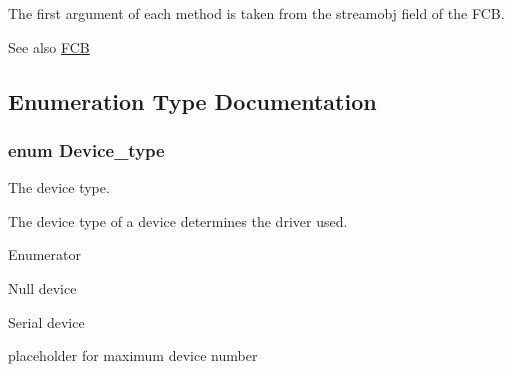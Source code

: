 The first argument of each method is taken from the \textquotesingle{}streamobj\textquotesingle{} field of the F\+CB. \begin{DoxySeeAlso}{See also}
\hyperlink{group__rlists_ga60c6c294fa1d8ea73ed270404fe5c17d}{F\+CB} 
\end{DoxySeeAlso}


\subsection{Enumeration Type Documentation}
\subsubsection[{\texorpdfstring{Device\+\_\+type}{Device_type}}]{\setlength{\rightskip}{0pt plus 5cm}enum {\bf Device\+\_\+type}}\hypertarget{group__dev_ga879ceac20e83b2375e5b49f4379b0c90}{}\label{group__dev_ga879ceac20e83b2375e5b49f4379b0c90}


The device type. 

The device type of a device determines the driver used. \begin{Desc}
\item[Enumerator]\par
\begin{description}
\item[{\em 
D\+E\+V\+\_\+\+N\+U\+LL\hypertarget{group__dev_gga879ceac20e83b2375e5b49f4379b0c90a8ca9ed7c2fc080b6706582ccf828b08f}{}\label{group__dev_gga879ceac20e83b2375e5b49f4379b0c90a8ca9ed7c2fc080b6706582ccf828b08f}
}]Null device \item[{\em 
D\+E\+V\+\_\+\+S\+E\+R\+I\+AL\hypertarget{group__dev_gga879ceac20e83b2375e5b49f4379b0c90adb43c91cf279ccd4510abaed9425bacc}{}\label{group__dev_gga879ceac20e83b2375e5b49f4379b0c90adb43c91cf279ccd4510abaed9425bacc}
}]Serial device \item[{\em 
D\+E\+V\+\_\+\+M\+AX\hypertarget{group__dev_gga879ceac20e83b2375e5b49f4379b0c90a4d07dfbc7e68d26e2d92773a37381ce7}{}\label{group__dev_gga879ceac20e83b2375e5b49f4379b0c90a4d07dfbc7e68d26e2d92773a37381ce7}
}]placeholder for maximum device number \end{description}
\end{Desc}


